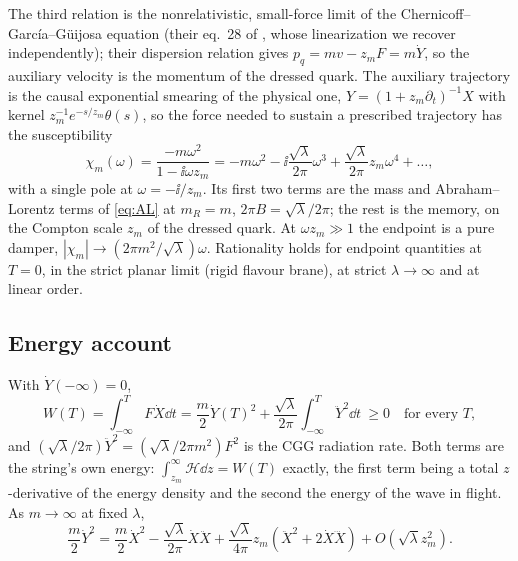 The third relation is the nonrelativistic, small-force limit of the Chernicoff--García--Güijosa equation
(their eq.~28 of \cite{CGGjhep}, whose linearization we recover independently); their dispersion relation gives
$p_q=mv-z_mF=m\dot Y$, so the auxiliary velocity is the momentum of the dressed quark. The auxiliary trajectory is the
causal exponential smearing of the physical one, $Y=(1+z_m\partial_t)^{-1}X$ with kernel $z_m^{-1}e^{-s/z_m}\theta(s)$,
so the force needed to sustain a prescribed trajectory has the susceptibility
\begin{equation}
\chi_m(\omega)=\frac{-m\omega^2}{1-\ii\omega z_m}=-m\omega^2-\ii\frac{\sqrt\lambda}{2\pi}\omega^3+\frac{\sqrt\lambda}{2\pi}z_m\omega^4+\dots,
\label{eq:chim}
\end{equation}
with a single pole at $\omega=-\ii/z_m$. Its first two terms are the mass and Abraham--Lorentz terms of
\eqref{eq:AL} at $m_R=m$, $2\pi B=\sqrt\lambda/2\pi$; the rest is the memory, on the Compton scale $z_m$ of the
dressed quark. At $\omega z_m\gg1$ the endpoint is a pure damper, $|\chi_m|\to(2\pi m^2/\sqrt\lambda)\omega$.
Rationality holds for endpoint quantities at $T=0$, in the strict planar limit (rigid flavour brane), at strict
$\lambda\to\infty$ and at linear order.

\subsection{Energy account}

\begin{proposition}
\label{prop:positive}
With $\dot Y(-\infty)=0$,
\begin{equation}
W(T)=\int_{-\infty}^TF\dot X\dd t=\frac m2\dot Y(T)^2+\frac{\sqrt\lambda}{2\pi}\int_{-\infty}^T\ddot Y^2\dd t\ \ge0\quad\text{for every }T,
\label{eq:Wfinite}
\end{equation}
and $(\sqrt\lambda/2\pi)\ddot Y^2=(\sqrt\lambda/2\pi m^2)F^2$ is the CGG radiation rate. Both terms are the string's own
energy: $\int_{z_m}^\infty\mathcal H\dd z=W(T)$ exactly, the first term being a total $z$-derivative of the energy
density and the second the energy of the wave in flight. As $m\to\infty$ at fixed $\lambda$,
\begin{equation}
\frac m2\dot Y^2=\frac m2\dot X^2-\frac{\sqrt\lambda}{2\pi}\dot X\ddot X+\frac{\sqrt\lambda}{4\pi}z_m(\ddot X^2+2\dot X\dddot X)+O(\sqrt\lambda z_m^2).
\end{equation}
\end{proposition}

